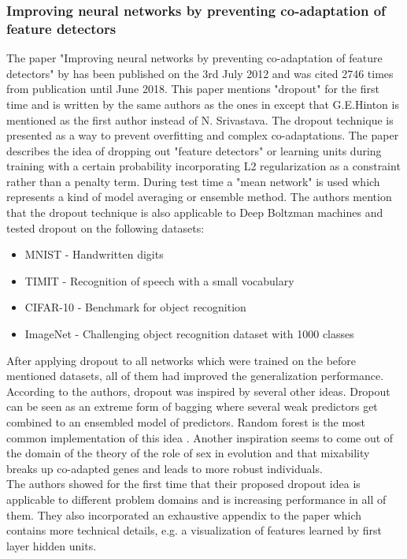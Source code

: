 \documentclass[a4paper]{article}
\begin{document}
\subsubsection{Improving neural networks by preventing co-adaptation of feature detectors}

The paper "Improving neural networks by preventing co-adaptation of feature detectors" by \cite{DBLP:journals/corr/abs-1207-0580} has been published on the 3rd July 2012 and was cited 2746 times from publication until June 2018.
This paper mentions "dropout" for the first time and is written by the same authors as the ones in \cite{Srivastava:2014:DSW:2627435.2670313} except that G.E.Hinton is mentioned as the first author instead of N. Srivastava. The dropout technique is presented as a way to prevent overfitting and complex co-adaptations. The paper describes the idea of dropping out "feature detectors" or learning units during training with a certain probability incorporating L2 regularization as a constraint rather than a penalty term. During test time a "mean network" is used which represents a kind of model averaging or ensemble method. The authors mention that the dropout technique is also applicable to Deep Boltzman machines and tested dropout on the following datasets:

\begin{itemize}
	\item MNIST - Handwritten digits
	\item TIMIT - Recognition of speech with a small vocabulary
	\item CIFAR-10 - Benchmark for object recognition
	\item ImageNet - Challenging object recognition dataset with 1000 classes
\end{itemize}

After applying dropout to all networks which were trained on the before mentioned datasets, all of them had improved the generalization performance. According to the authors, dropout was inspired by several other ideas. Dropout can be seen as an extreme form of bagging \cite{breiman1996bagging} where several weak predictors get combined to an ensembled model of predictors. Random forest is the most common implementation of this idea \cite{breiman2001random}. Another inspiration seems to come out of the domain of the theory of the role of sex in evolution \cite{livnat2010sex} and that mixability breaks up co-adapted genes and leads to more robust individuals.\\
The authors showed for the first time that their proposed dropout idea is applicable to different problem domains and is increasing performance in all of them. They also incorporated an exhaustive appendix to the paper which contains more technical details, e.g. a visualization of features learned by first layer hidden units.
\end{document}
